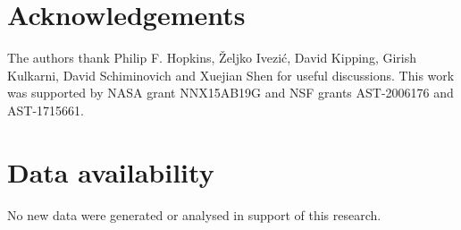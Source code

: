 \documentclass[fleqn,usenatbib]{mnras}
\begin{document}
\section*{Acknowledgements}
The authors thank Philip F. Hopkins, \v{Z}eljko Ivezi\'{c}, David Kipping, Girish Kulkarni, David Schiminovich and Xuejian Shen for useful discussions.  This work was supported by NASA grant NNX15AB19G and NSF grants AST-2006176 and AST-1715661.

\section*{Data availability}
No new data were generated or analysed in support of this research.


 
\bsp
\label{lastpage}
\end{document}
